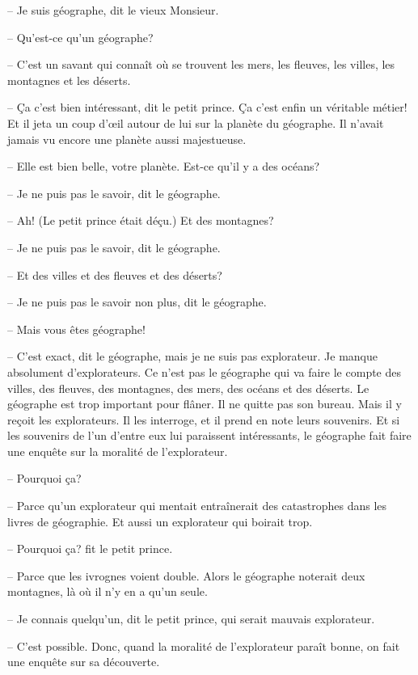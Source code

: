 \documentclass[a4paper]{report}
\begin{document}
-- Je suis géographe, dit le vieux Monsieur.

-- Qu'est-ce qu'un géographe?

-- C'est un savant qui connaît où se trouvent les mers, les fleuves, les villes, les montagnes et les déserts.

-- Ça c'est bien intéressant, dit le petit prince. Ça c'est enfin un véritable métier! Et il jeta un coup d'œil autour de lui sur la planète du géographe. Il n'avait jamais vu encore une planète aussi majestueuse.

-- Elle est bien belle, votre planète. Est-ce qu'il y a des océans?

-- Je ne puis pas le savoir, dit le géographe.

-- Ah! (Le petit prince était déçu.) Et des montagnes?

-- Je ne puis pas le savoir, dit le géographe.

-- Et des villes et des fleuves et des déserts?

-- Je ne puis pas le savoir non plus, dit le géographe.

-- Mais vous êtes géographe!

-- C'est exact, dit le géographe, mais je ne suis pas explorateur. Je manque absolument d'explorateurs. Ce n'est pas le géographe qui va faire le compte des villes, des fleuves, des montagnes, des mers, des océans et des déserts. Le géographe est trop important pour flâner. Il ne quitte pas son bureau. Mais il y reçoit les explorateurs. Il les interroge, et il prend en note leurs souvenirs. Et si les souvenirs de l'un d'entre eux lui paraissent intéressants, le géographe fait faire une enquête sur la moralité de l'explorateur.

-- Pourquoi ça?

-- Parce qu'un explorateur qui mentait entraînerait des catastrophes dans les livres de géographie. Et aussi un explorateur qui boirait trop.

-- Pourquoi ça? fit le petit prince.

-- Parce que les ivrognes voient double. Alors le géographe noterait deux montagnes, là où il n'y en a qu'un seule.

-- Je connais quelqu'un, dit le petit prince, qui serait mauvais explorateur.

-- C'est possible. Donc, quand la moralité de l'explorateur paraît bonne, on fait une enquête sur sa découverte.
\end{document}

